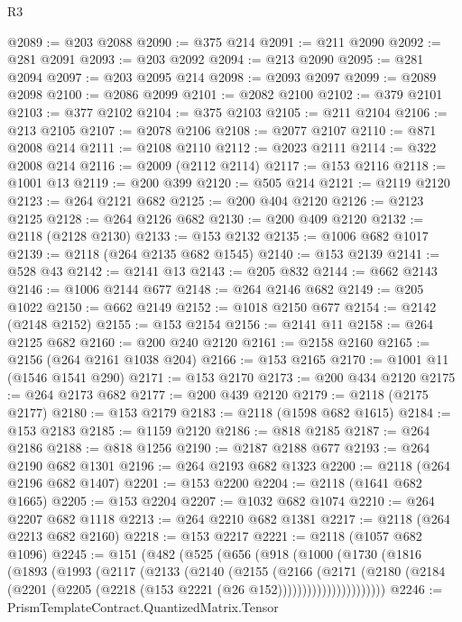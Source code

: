 \begin{lexlean}{R3}
\begin{coremodule}
@2089 := @203 @2088
@2090 := @375 @214
@2091 := @211 @2090
@2092 := @281 @2091
@2093 := @203 @2092
@2094 := @213 @2090
@2095 := @281 @2094
@2097 := @203 @2095 @214
@2098 := @2093 @2097
@2099 := @2089 @2098
@2100 := @2086 @2099
@2101 := @2082 @2100
@2102 := @379 @2101
@2103 := @377 @2102
@2104 := @375 @2103
@2105 := @211 @2104
@2106 := @213 @2105
@2107 := @2078 @2106
@2108 := @2077 @2107
@2110 := @871 @2008 @214
@2111 := @2108 @2110
@2112 := @2023 @2111
@2114 := @322 @2008 @214
@2116 := @2009 (@2112 @2114)
@2117 := @153 @2116
@2118 := @1001 @13
@2119 := @200 @399
@2120 := @505 @214
@2121 := @2119 @2120
@2123 := @264 @2121 @682
@2125 := @200 @404 @2120
@2126 := @2123 @2125
@2128 := @264 @2126 @682
@2130 := @200 @409 @2120
@2132 := @2118 (@2128 @2130)
@2133 := @153 @2132
@2135 := @1006 @682 @1017
@2139 := @2118 (@264 @2135 @682 @1545)
@2140 := @153 @2139
@2141 := @528 @43
@2142 := @2141 @13
@2143 := @205 @832
@2144 := @662 @2143
@2146 := @1006 @2144 @677
@2148 := @264 @2146 @682
@2149 := @205 @1022
@2150 := @662 @2149
@2152 := @1018 @2150 @677
@2154 := @2142 (@2148 @2152)
@2155 := @153 @2154
@2156 := @2141 @11
@2158 := @264 @2125 @682
@2160 := @200 @240 @2120
@2161 := @2158 @2160
@2165 := @2156 (@264 @2161 @1038 @204)
@2166 := @153 @2165
@2170 := @1001 @11 (@1546 @1541 @290)
@2171 := @153 @2170
@2173 := @200 @434 @2120
@2175 := @264 @2173 @682
@2177 := @200 @439 @2120
@2179 := @2118 (@2175 @2177)
@2180 := @153 @2179
@2183 := @2118 (@1598 @682 @1615)
@2184 := @153 @2183
@2185 := @1159 @2120
@2186 := @818 @2185
@2187 := @264 @2186
@2188 := @818 @1256
@2190 := @2187 @2188 @677
@2193 := @264 @2190 @682 @1301
@2196 := @264 @2193 @682 @1323
@2200 := @2118 (@264 @2196 @682 @1407)
@2201 := @153 @2200
@2204 := @2118 (@1641 @682 @1665)
@2205 := @153 @2204
@2207 := @1032 @682 @1074
@2210 := @264 @2207 @682 @1118
@2213 := @264 @2210 @682 @1381
@2217 := @2118 (@264 @2213 @682 @2160)
@2218 := @153 @2217
@2221 := @2118 (@1057 @682 @1096)
@2245 := @151
    (@482
      (@525
        (@656
          (@918
            (@1000
              (@1730
                (@1816
                  (@1893
                    (@1993
                      (@2117
                        (@2133
                          (@2140
                            (@2155
                              (@2166
                                (@2171
                                  (@2180
                                    (@2184
                                      (@2201
                                        (@2205 (@2218 (@153 @2221 (@26 @152))))))))))))))))))))))
@2246 := PrismTemplateContract.QuantizedMatrix.Tensor

\end{coremodule}
\end{lexlean}
